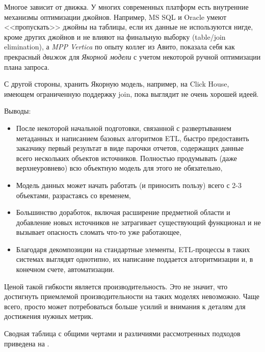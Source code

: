 \documentclass[%
	11pt,
	a4paper,
	utf8,
		]{article}
\begin{document}
Многое зависит от движка. У многих современных платформ есть внутренние механизмы оптимизации джойнов. Например, MS SQL и Oracle умеют <<пропускать>> джойны на таблицы, если их данные не используются нигде, кроме других джойнов и не влияют на финальную выборку (table/join elimination), а \emph{MPP Vertica} по опыту коллег из Авито, показала себя как прекрасный \emph{движок} для \emph{Якорной модели} с учетом некоторой ручной оптимизации плана запроса.

С другой стороны, хранить Якорную модель, например, на Click House, имеющем ограниченную поддержку join, пока выглядит не очень хорошей идеей.

Выводы:
\begin{itemize}
	\item После некоторой начальной подготовки, связанной с развертыванием метаданных и написанием базовых алгоритмов ETL, быстро предоставить заказчику первый результат в виде парочки отчетов, содержащих данные всего нескольких объектов источников. Полностью продумывать (даже верхнеуровнево) всю объектную модель для этого не обязательно,
	
	\item Модель данных может начать работать (и приносить пользу) всего с 2-3 объектами, разрастаясь со временем,
	
	\item Большинство доработок, включая расширение предметной области и добавление новых источников не затрагивает существующий функционал и не вызывает опасность сломать что-то уже работающее,
	
	\item Благодаря декомпозиции на стандартные элементы, ETL-процессы в таких системах выглядят однотипно, их написание поддается алгоритмизации и, в конечном счете, автоматизации.
\end{itemize}

Ценой такой гибкости является производительность. Это не значит, что достигнуть приемлемой производительности на таких моделях невозможно. Чаще всего, просто может потребоваться больше усилий и внимания к деталям для достижения нужных метрик.

Сводная таблица с общими чертами и различиями рассмотренных подходов приведена на .
\end{document}
